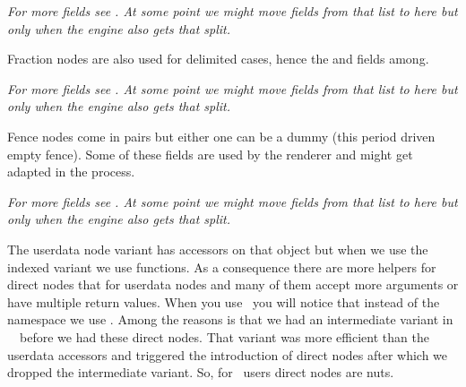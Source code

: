
{\em For more fields see . At some point we might move fields from
that list to here but only when the engine also gets that split.}


\stopsubsection

\startsubsection[title={fraction}]

Fraction nodes are also used for delimited cases, hence the  and
 fields among.


{\em For more fields see . At some point we might move fields from
that list to here but only when the engine also gets that split.}


\stopsubsection

\startsubsection[title={fence}]

Fence nodes come in pairs but either one can be a dummy (this period driven empty
fence). Some of these fields are used by the renderer and might get adapted in
the process.


{\em For more fields see . At some point we might move fields from
that list to here but only when the engine also gets that split.}


\stopsubsection

\stopsection

\startsection[title=Helpers]

\startsubsection[title={Introduction}]

The userdata node variant has accessors on that object but when we use the
indexed variant we use functions. As a consequence there are more helpers for
direct nodes that for userdata nodes and many of them accept more arguments or
have multiple return values. When you use \CONTEXT\ you will notice that instead
of the  namespace we use . Among the reasons is
that we had an intermediate variant in \CONTEXT\ \MKIV\ before we had these
direct nodes. That variant was more efficient than the userdata accessors and
triggered the introduction of direct nodes after which we dropped the
intermediate variant. So, for \CONTEXT\ users direct nodes are nuts.

